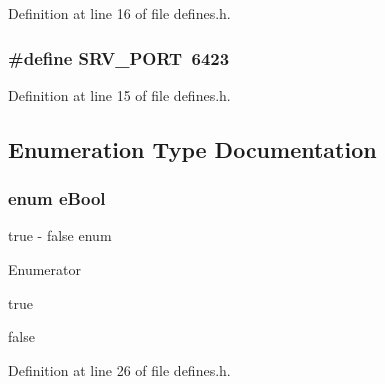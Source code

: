 Definition at line 16 of file defines.\-h.

\subsubsection[{S\-R\-V\-\_\-\-P\-O\-R\-T}]{\setlength{\rightskip}{0pt plus 5cm}\#define S\-R\-V\-\_\-\-P\-O\-R\-T~6423}\label{defines_8h_aee1132b8a79e9a6dd0d19a93f7133389}


Definition at line 15 of file defines.\-h.



\subsection{Enumeration Type Documentation}
\subsubsection[{e\-Bool}]{\setlength{\rightskip}{0pt plus 5cm}enum {\bf e\-Bool}}\label{defines_8h_a380ce63b151a8118e69bcaa34f731958}
true -\/ false enum \begin{Desc}
\item[Enumerator]\par
\begin{description}
\item[{\em 
true\label{defines_8h_a380ce63b151a8118e69bcaa34f731958a08f175a5505a10b9ed657defeb050e4b}
}]true \item[{\em 
false\label{defines_8h_a380ce63b151a8118e69bcaa34f731958ae9de385ef6fe9bf3360d1038396b884c}
}]false \end{description}
\end{Desc}


Definition at line 26 of file defines.\-h.

